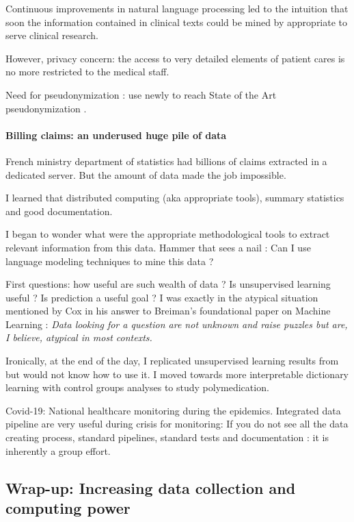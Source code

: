 \documentclass{report}
\begin{document}
Continuous improvements in natural language processing led to the intuition that
soon the information contained in clinical texts could be mined by appropriate
to serve clinical research.

However, privacy concern: the access to very detailed elements of patient cares
is no more restricted to the medical staff.

Need for pseudonymization : use newly to reach State of the Art pseudonymization
\citep{dernoncourt2017identification, paris2019desidentification}.

\paragraph{Billing claims: an underused huge pile of data}

French ministry department of statistics had billions of claims extracted in a
dedicated server. But the amount of data made the job impossible.

I learned that distributed computing (aka appropriate tools), summary statistics
and good documentation.

I began to wonder what were the appropriate methodological tools to extract
relevant information from this data. Hammer that sees a nail : Can I use language
modeling techniques to mine this data ?

First questions: how useful are such wealth of data ? Is unsupervised learning
useful ? Is prediction a useful goal ? I was exactly in the atypical situation
mentioned by Cox in his answer to Breiman's foundational paper on Machine
Learning \citep{breiman2001statistical} : \textit{Data looking for a question are
  not unknown and raise puzzles but are, I believe, atypical in most contexts.}

Ironically, at the end of the day, I
replicated unsupervised learning results from \citep{beam2019clinical} but would
not know how to use it. I moved towards more interpretable dictionary learning
with control groups analyses to study polymedication.

Covid-19: National healthcare monitoring during the epidemics. Integrated data
pipeline are very useful during crisis for monitoring: If you do not see all the
data creating process, standard pipelines, standard tests and documentation : it
is inherently a group effort.

\subsection{Wrap-up: Increasing data collection and computing power}\label{subsec:intro:wrapup}
\end{document}
